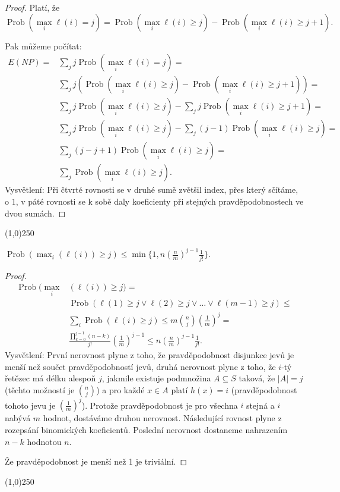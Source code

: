 \documentclass[a4paper,12pt]{article}
\newenvironment{myproof}{
  \begin{proof}
    
  }{
  \end{proof}
  \begin{center}
   \line(1,0){250}
   \end{center}
  }
\DeclareMathOperator*{\Prob}{Prob}
\begin{document}
\begin{myproof}
Platí, že
$$\Prob(\max_i\ell (i)=j)=\Prob(\max_i\ell (i)\ge j)-\Prob(\max_i
\ell (i)\ge j+1).$$

Pak můžeme počítat:
\begin{align*} E(NP)=&\sum_jj\Prob(\max_i\ell (i)=j)=\\
&\sum_jj(\Prob(\max_i\ell (i)\ge j)-\Prob(\max_i\ell (i)\ge j+1))
=\\
&\sum_jj\Prob(\max_i\ell (i)\ge j)-\sum_jj\Prob(\max_i\ell (i)\ge 
j+1)=\\
&\sum_jj\Prob(\max_i\ell (i)\ge j)-\sum_j(j-1)\Prob(\max_i\ell (i
)\ge j)=\\
&\sum_j(j-j+1)\Prob(\max_i\ell (i)\ge j)=\\
&\sum_j\Prob(\max_i\ell (i)\ge j).\end{align*}
Vysvětlení: Při čtvrté rovnosti se v druhé sumě zvětšil 
index, přes který sčítáme, o $1$, v páté rovnosti se k sobě 
daly koeficienty při stejných pravděpodobnostech ve dvou 
sumách. 

\end{myproof}

\begin{lemma}
$\Prob(\max_i(\ell (i))\ge j)\le\min\{1,n(\frac nm)^{j-1}\frac 1{
j!}\}.$
\end{lemma}

\begin{myproof}
\begin{align*}\Prob(\max_i&(\ell (i))\ge j)=\\
&\Prob(\ell (1)\ge j\vee\ell (2)\ge j\vee\dots\vee\ell (m-1)\ge j
)\le\\
&\sum_i\Prob(\ell (i)\ge j)\le m\binom nj(\frac 1m)^j=\\
&\frac {\prod_{k=0}^{j-1}(n-k)}{j!}(\frac 1m)^{j-1}\le n(\frac nm
)^{j-1}\frac 1{j!}.\end{align*}
Vysvětlení:  První nerovnost plyne z toho, že 
pravděpodobnost disjunkce jevů je menší než 
součet pravděpodobností jevů, dru\-há nerovnost 
plyne z toho, že $i$-tý řetězec má délku alespoň $
j$, jakmile existuje 
podmnožina $A\subseteq S$ taková, že $|A|=j$ (těchto možností je $\binom 
nj$) a pro každé $x\in A$ platí $h(x)=i$ (pravděpo\-dob\-nost 
tohoto jevu je $(\frac 1m)^j$). Protože pravděpodobnost je pro všechna $i$ stejná a $i$ nabývá $m$ hodnot, dostáváme druhou nerovnost. Následující rovnost plyne z rozepsání binomických koeficientů. Poslední nerovnost dostane\-me nahrazením $n-k$ hodnotou $n$.

Že pravděpodobnost je menší než 1 je triviální.

\end{myproof}
\end{document}
